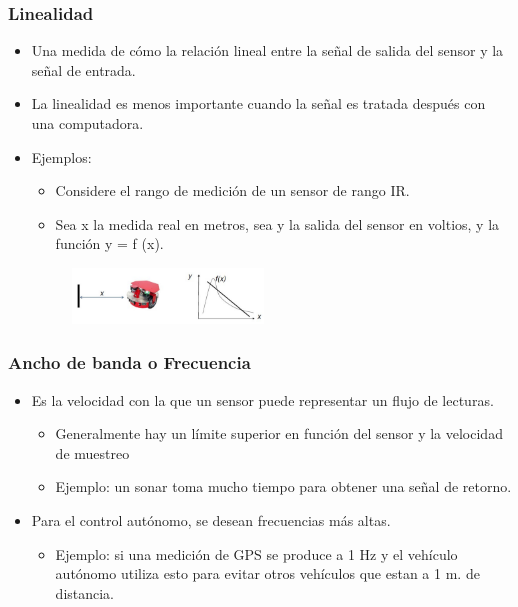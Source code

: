\documentclass{beamer}
\begin{document}
\begin{frame}
\frametitle{Linealidad}
\begin{itemize}
\item Una medida de cómo la relación lineal entre la señal de salida del sensor y la señal de entrada.
\item La linealidad es menos importante cuando la señal es tratada después con una computadora.
\item Ejemplos:
\begin{itemize}
\item Considere el rango de medición de un sensor de rango IR.
\item Sea x la medida real en metros, sea y la salida del sensor en voltios, y la función y = f (x).
\end{itemize}
\begin{figure}[!h]
\centering
\includegraphics[width=2in]{linealidad}
\end{figure}
\end{itemize}
\end{frame}

\begin{frame}
\frametitle{Ancho de banda o Frecuencia}
\begin{itemize}
\item Es la velocidad con la que un sensor puede representar un flujo de lecturas.
\begin{itemize}
\item Generalmente hay un límite superior en función del sensor y la velocidad de muestreo
\item Ejemplo: un sonar toma mucho tiempo para obtener una señal de retorno.
\end{itemize}
\item Para el control autónomo, se desean frecuencias más altas.
\begin{itemize}
\item Ejemplo: si una medición de GPS se produce a 1 Hz y el vehículo autónomo utiliza esto para evitar otros vehículos que estan a 1 m. de distancia.
\end{itemize}
\end{itemize}
\end{frame}
\end{document}
